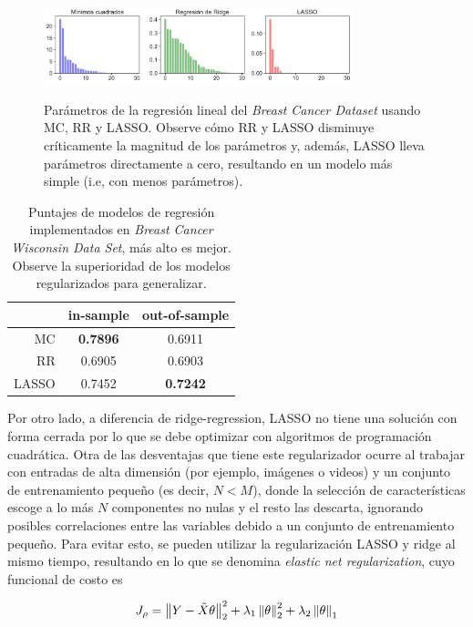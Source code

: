 \begin{figure}[H]
	\centering
	\includegraphics[width=0.8\textwidth]{img/cap2_OLS_RR_LASSO.pdf}\\
	\caption{Parámetros de la regresión lineal del \emph{Breast Cancer Dataset} usando MC, RR y LASSO. Observe cómo RR y LASSO disminuye críticamente la magnitud de los parámetros y, además, LASSO lleva parámetros directamente a cero, resultando en un modelo más simple (i.e, con menos parámetros).}
	\label{fig:MC_RR_LASSO_breastcancer}  
\end{figure}

\begin{table}[h]
\centering
	\begin{tabular}{ r|c|c } 
		 & in-sample & out-of-sample \\
		\hline
		MC & \textbf{0.7896} & 0.6911 \\ 
		RR & 0.6905 & 0.6903 \\ 
		LASSO & 0.7452 & \textbf{0.7242}
	\end{tabular}
	\caption{Puntajes de modelos de regresión implementados en \emph{Breast Cancer Wisconsin Data Set}, más alto es mejor. Observe la superioridad de los modelos regularizados para generalizar.}
	\label{tab:breastMC_RR_LASSO}
\end{table}

Por otro lado, a diferencia de ridge-regression, LASSO no tiene una solución con forma cerrada por lo que se debe optimizar con algoritmos de programación cuadrática. Otra de las desventajas que tiene este regularizador ocurre al trabajar con entradas de alta dimensión (por ejemplo, imágenes o videos) y un conjunto de entrenamiento pequeño (es decir, $N< M$), donde la selección de características escoge a lo más $N$ componentes no nulas y el resto las descarta, ignorando posibles correlaciones entre las variables debido a un conjunto de entrenamiento pequeño. Para evitar esto, se pueden utilizar la regularización LASSO y ridge al mismo tiempo, resultando en lo que se denomina \emph{elastic net regularization}, cuyo funcional de costo es

\begin{equation}
	J_\rho = \left\lVert Y-\tilde{X}\theta\right\rVert_2^2 + \lambda_1\left\lVert\theta\right\rVert_2^2 + \lambda_2\left\lVert\theta\right\rVert_1
\end{equation} 

